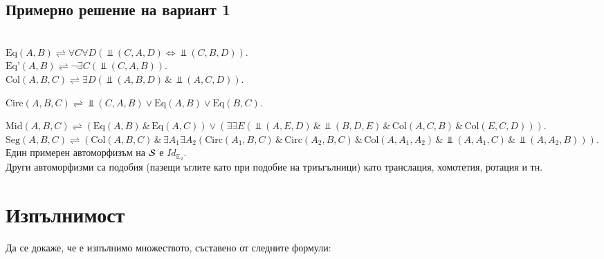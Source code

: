 \documentclass{article}
\theoremstyle{definition}
\begin{document}
\subsection{Примерно решение на вариант 1}
\\
\def\bot{\Perp}
$ \text{Eq}(A,B) \rightleftharpoons \forall C \forall D(\bot(C,A,D)\iff \bot(C,B,D)). $\\
$ \text{Eq'}(A,B) \rightleftharpoons \neg \exists C (\bot(C,A,B)). $\\
$ \text{Col}(A,B,C) \rightleftharpoons \exists D (\bot(A,B,D) \,\&\, \bot(A,C,D) ).$\\
\begin{center}
 \end{center}
$ \text{Circ}(A,B,C) \rightleftharpoons \bot(C,A,B) \lor \text{Eq}(A,B) \lor \text{Eq}(B,C). $\\
\begin{center}
 \end{center}
$ \text{Mid}(A,B,C) \rightleftharpoons (\text{Eq}(A,B) \,\&\, \text{Eq}(A,C) )\lor (\exists  \exists E(\bot(A,E,D) \,\&\, \bot(B,D,E) \,\&\, \text{Col}(A,C,B) \,\&\, \text{Col}(E,C,D))). $\\
$ \text{Seg}(A,B,C) \rightleftharpoons  (\text{Col}(A,B,C) \,\&\,\exists A_1 \exists A_2(\text{Circ}(A_1,B,C) \,\&\, \text{Circ}(A_2,B,C) \,\&\, \text{Col}(A, A_1, A_2) \,\&\, \bot(A,A_1, C) \,\&\, \bot(A,A_2,B))). $\\

Един примерен автоморфизъм на $\cal S$ е $Id_{\mathbb{E}_2}$.\\
Други автоморфизми са подобия (пазещи ъглите като при подобие на триъгълници) като транслация, хомотетия, ротация и тн.

\newpage
\section{Изпълнимост}
Да се докаже, че е изпълнимо множеството, съставено от следните формули:
\end{document}

